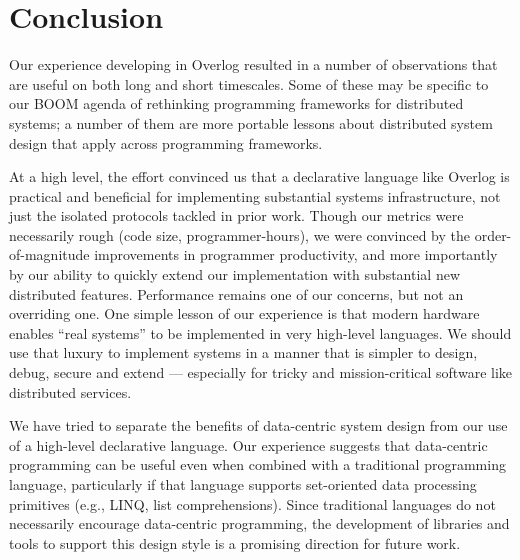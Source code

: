 \section{Conclusion}
Our experience developing \BOOMA in Overlog resulted in a number of observations
that are useful on both long and short timescales.  Some of these may be
specific to our BOOM agenda of rethinking programming frameworks for distributed
systems; a number of them are more portable lessons about distributed system
design that apply across programming frameworks.

At a high level, the effort convinced us that a declarative language like
Overlog is practical and beneficial for implementing substantial systems
infrastructure, not just the isolated protocols tackled in prior work.  Though
our metrics were necessarily rough (code size, programmer-hours), we were
convinced by the order-of-magnitude improvements in programmer productivity, and
more importantly by our ability to quickly extend our implementation with
substantial new distributed features.  Performance remains one of our concerns,
but not an overriding one.  One simple lesson of our experience is that modern
hardware enables ``real systems'' to be implemented in very high-level
languages.  We should use that luxury to implement systems in a manner that is
simpler to design, debug, secure and extend --- especially for tricky and
mission-critical software like distributed services.

We have tried to separate the benefits of data-centric system design from our
use of a high-level declarative language. Our experience suggests that
data-centric programming can be useful even when combined with a traditional
programming language, particularly if that language supports set-oriented data
processing primitives (e.g., LINQ, list comprehensions). Since traditional
languages do not necessarily encourage data-centric programming, the development
of libraries and tools to support this design style is a promising direction for
future work.


